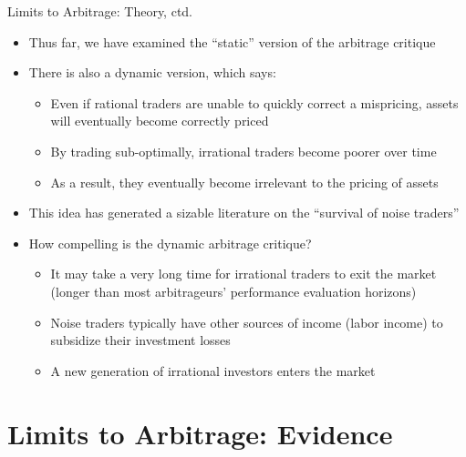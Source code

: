 \documentclass[aspectratio=169, 11pt]{beamer}
\begin{document}
\begin{frame}[shrink=5]{Limits to Arbitrage: Theory, ctd.}
\begin{itemize}
\item Thus far, we have examined the ``static'' version of the arbitrage critique
\item There is also a dynamic version, which says:
  \begin{itemize}
  \item Even if rational traders are unable to quickly correct a mispricing, assets will eventually become correctly priced
  \item By trading sub-optimally, irrational traders become poorer over time
  \item As a result, they eventually become irrelevant to the pricing of assets
  \end{itemize}
\item This idea has generated a sizable literature on the ``survival of noise traders''
\item How compelling is the dynamic arbitrage critique?
  \begin{itemize}
  \item It may take a very long time for irrational traders to exit the market (longer than most arbitrageurs' performance evaluation horizons) 
  \item Noise traders typically have other sources of income (labor income) to subsidize their investment losses
  \item A new generation of irrational investors enters the market
  \end{itemize}
\end{itemize}
\end{frame}

\section{Limits to Arbitrage: Evidence}
\end{document}
